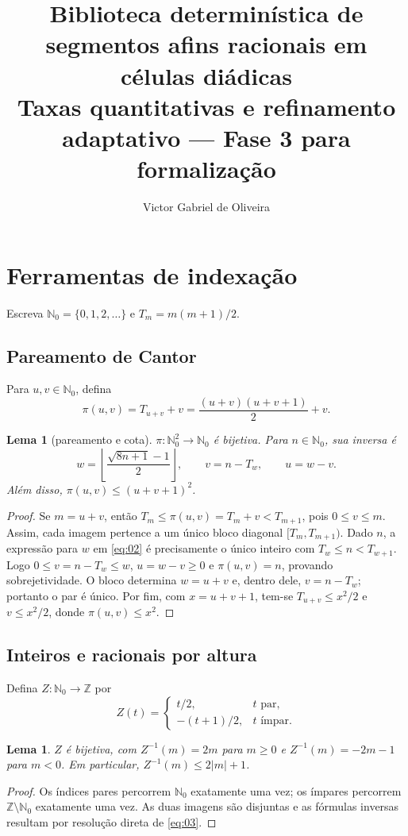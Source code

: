\documentclass[11pt,a4paper]{article}
\title{Biblioteca determinística de segmentos afins racionais em células diádicas\\
Taxas quantitativas e refinamento adaptativo — Fase 3 para formalização}
\author{Victor Gabriel de Oliveira}
\date{}
\theoremstyle{preciso}
\newtheorem{lema}[teorema]{Lema}
\theoremstyle{definition}
\newcommand{\N}{\mathbb N}
\newcommand{\Z}{\mathbb Z}
\newcommand{\eqn}[2]{\begin{equation}\label{eq:#1}#2\end{equation}}
\begin{document}
\maketitle
\setcounter{section}{1}

\section{Ferramentas de indexação}
Escreva $\N_0=\{0,1,2,\ldots\}$ e $T_m=m(m+1)/2$.

\subsection{Pareamento de Cantor}
Para $u,v\in\N_0$, defina
\eqn{01}{\pi(u,v)=T_{u+v}+v=\frac{(u+v)(u+v+1)}2+v.}
\begin{lema}[pareamento e cota]
$\pi:\N_0^2\to\N_0$ é bijetiva. Para $n\in\N_0$, sua inversa é
\eqn{02}{w=\left\lfloor\frac{\sqrt{8n+1}-1}{2}\right\rfloor,\qquad v=n-T_w,\qquad u=w-v.}
Além disso, $\pi(u,v)\le(u+v+1)^2$.
\end{lema}
\begin{proof}
Se $m=u+v$, então $T_m\le\pi(u,v)=T_m+v<T_{m+1}$, pois $0\le v\le m$. Assim, cada imagem pertence a um único bloco diagonal $[T_m,T_{m+1})$. Dado $n$, a expressão para $w$ em \eqref{eq:02} é precisamente o único inteiro com $T_w\le n<T_{w+1}$. Logo $0\le v=n-T_w\le w$, $u=w-v\ge0$ e $\pi(u,v)=n$, provando sobrejetividade. O bloco determina $w=u+v$ e, dentro dele, $v=n-T_w$; portanto o par é único. Por fim, com $x=u+v+1$, tem-se $T_{u+v}\le x^2/2$ e $v\le x^2/2$, donde $\pi(u,v)\le x^2$.
\end{proof}

\subsection{Inteiros e racionais por altura}
Defina $Z:\N_0\to\Z$ por
\eqn{03}{Z(t)=\begin{cases}t/2,&t\text{ par},\\-(t+1)/2,&t\text{ ímpar}.\end{cases}}
\begin{lema}
$Z$ é bijetiva, com $Z^{-1}(m)=2m$ para $m\ge0$ e $Z^{-1}(m)=-2m-1$ para $m<0$. Em particular, $Z^{-1}(m)\le2|m|+1$.
\end{lema}
\begin{proof}
Os índices pares percorrem $\N_0$ exatamente uma vez; os ímpares percorrem $\Z\setminus\N_0$ exatamente uma vez. As duas imagens são disjuntas e as fórmulas inversas resultam por resolução direta de \eqref{eq:03}.
\end{proof}
\end{document}
